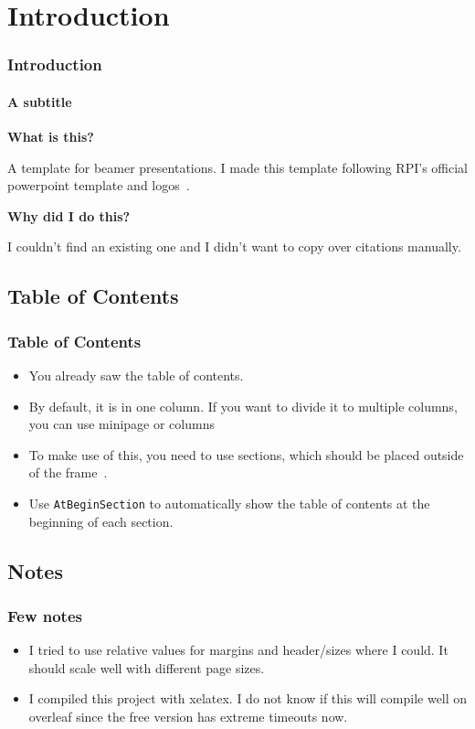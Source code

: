 \documentclass[
	11pt, %
	aspectratio=169, %
]{beamer}
\begin{document}

\section{Introduction}
\begin{frame}
	\frametitle{Introduction} %
  \framesubtitle{A subtitle}
  {
    \Large \bf
    What is this?
  }

  A template for beamer presentations.
  I made this template following RPI's official powerpoint template and logos~\cite{rpiHomeStrategicCommunications}. 

  \vspace{1cm}
  {
    \Large \bf
    Why did I do this?
  }

  I couldn't find an existing one and I didn't want to copy over citations manually.
	
\end{frame}

\subsection{Table of Contents}
\begin{frame}
  \frametitle{Table of Contents}
  \begin{itemize}
    \item You already saw the table of contents.
    \item By default, it is in one column. If you want to divide it to multiple columns, you can use minipage or columns~\cite{samcarter_is_at_topanswers.xyzAnswerBeamerVertical2013}
    \item To make use of this, you need to use sections, which should be placed outside of the frame~\cite{campaAnswerAtbeginsectionReturns2022}.
    \item Use \texttt{AtBeginSection} to automatically show the table of contents at the beginning of each section.
\end{itemize}
\end{frame}

\subsection{Notes}
\begin{frame}
	\frametitle{Few notes}
  \begin{itemize}
    \item I tried to use relative values for margins and header/sizes where I could. It should scale well with different page sizes.
    \item I compiled this project with xelatex. I do not know if this will compile well on overleaf since the free version has extreme timeouts now. 
  \end{itemize}
\end{frame}
\end{document}
